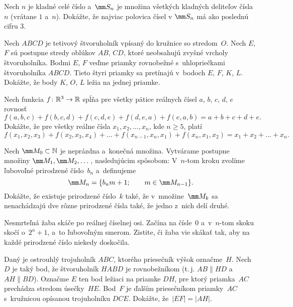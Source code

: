 {%
Nech $n$ je kladné celé číslo a~$\mm S_n$ je množina všetkých kladných deliteľov čísla $n$ (vrátane $1$ a~$n$). Dokážte, že najviac polovica čísel v $\mm S_n$ má ako poslednú cifru 3.}

{%
Nech $ABCD$ je tetivový štvoruholník vpísaný do kružnice so stredom~$O$. Nech $E$, $F$ sú postupne stredy oblúkov $AB$, $CD$, ktoré neobsahujú zvyšné vrcholy štvoruholníka. Bodmi $E$, $F$ veďme priamky rovnobežné s~uhlopriečkami štvoruholníka $ABCD$. Tieto štyri priamky sa pretínajú v~bodoch $E$, $F$, $K$, $L$. Dokážte, že body $K$, $O$, $L$ ležia na jednej priamke.}

{%
Nech funkcia $f\colon\Bbb R^3\to\Bbb R$ spĺňa pre všetky pätice reálnych čísel $a$, $b$, $c$, $d$, $e$ rovnosť
$$
f(a,b,c)+f(b,c,d)+f(c,d,e)+f(d,e,a)+f(e,a,b)=a+b+c+d+e.
$$
Dokážte, že pre všetky reálne čísla $x_1,x_2,\dots,x_n$, kde $ n\ge 5$, platí
$$
f(x_1,x_2,x_3)+f(x_2,x_3,x_4)+\ldots +f(x_{n-1},x_n,x_1)+f(x_n,x_1,x_2)=x_1+x_2+\ldots+x_n.
$$}

{%
Nech $\mm M_0 \subset  \Bbb N$ je neprázdna a~konečná množina. Vytvárame postupne množiny $\mm M_1,\mm M_2,\dots$, nasledujúcim spôsobom: V~$n$-tom kroku zvolíme ľubovoľné prirodzené číslo~$b_n$ a~definujeme
$$
\mm M_n = \{ b_nm+1;\qquad m\in \mm M_{n-1} \}.
$$
Dokážte, že existuje prirodzené číslo~$k$ také, že v~množine~$\mm M_k$ sa nenachádzajú dve rôzne prirodzené čísla také, že jedno z~nich delí druhé.}

{%
Nesmrteľná žaba skáče po reálnej číselnej osi. Začína na čísle~$0$ a~v~$n$-tom skoku skočí o~$2^n+1$, a~to ľubovoľným smerom. Zistite, či žaba vie skákať tak, aby na každé prirodzené číslo niekedy doskočila.}

{%
Daný je ostrouhlý trojuholník $ABC$, ktorého priesečník výšok označme~$H$. Nech $D$ je taký bod, že štvoruholník $HABD$ je rovnobežníkom (t.\,j. $AB\parallel HD$ a~${AH\parallel BD}$). Označme $E$ ten bod ležiaci na priamke $DH$, pre ktorý priamka~$AC$ prechádza stredom úsečky~$HE$.
Bod~$F$ je ďalším priesečníkom priamky~$AC$ s~kružnicou opísanou trojuholníku $DCE$.
Dokážte, že~$|EF|=|AH|$.}

